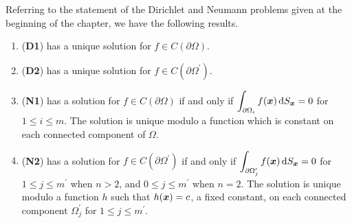 \begin{theorem} \label{pot_exist_uniqu_TH}
Referring to the statement of the Dirichlet and Neumann problems given
at the beginning of the chapter, we have the following results.
\begin{enumerate}
\item ({\bfseries D1}) has a unique solution for $f \in  C(\partial \Omega)$.
\item ({\bfseries D2}) has a unique solution for
$\displaystyle f \in  C(\partial \Omega^{\prime})$.
\item ({\bfseries N1}) has a solution for $f \in  C(\partial \Omega)$
if and only if
$\displaystyle \int_{\partial \Omega_i} f({\bm{x}})\,\mathrm{d}{S}_{{\bm{x}}}=0$
for $1 \leq i \leq m$.  The solution is unique modulo a
function which is constant on each connected component of $\Omega$.
\item ({\bfseries N2}) has a solution for
$\displaystyle f \in  C(\partial \Omega^{\prime})$ if and only if
$\displaystyle \int_{\partial \Omega_j^{\prime}} f({\bm{x}})\,\mathrm{d}{S}_{{\bm{x}}}=0$
for $\displaystyle 1\leq j \leq m^{\prime}$ when $n>2$, and
$\displaystyle 0\leq j \leq m^{\prime}$ when $n=2$.  The solution is
unique modulo a function $h$ such that $h({\bm{x}}) = c$, a fixed
constant, on each connected component
$\displaystyle \Omega_j^{\prime}$ for $\displaystyle 1\leq j \leq m^{\prime}$.
\end{enumerate}
\end{theorem}

